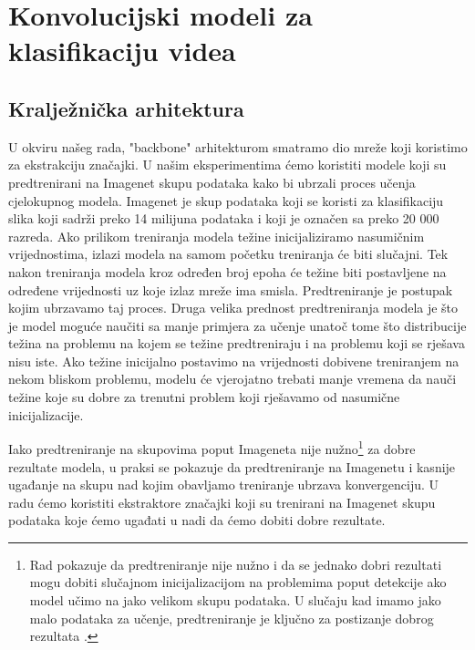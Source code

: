 \documentclass[times, utf8, diplomski,  numeric]{fer}
\begin{document}
\chapter{Konvolucijski modeli za klasifikaciju videa}
\section{Kralježnička arhitektura }
U okviru našeg rada, "backbone" arhitekturom smatramo dio mreže koji koristimo za ekstrakciju značajki. U našim eksperimentima ćemo koristiti modele koji su predtrenirani na Imagenet skupu podataka kako bi ubrzali proces učenja cjelokupnog modela. Imagenet je skup podataka koji se koristi za klasifikaciju slika koji sadrži preko 14 milijuna podataka i koji je označen sa preko 20 000 razreda. Ako prilikom treniranja modela težine inicijaliziramo nasumičnim vrijednostima, izlazi modela na samom početku treniranja će biti slučajni. Tek nakon treniranja modela kroz određen broj epoha će težine biti postavljene na određene vrijednosti uz koje izlaz mreže ima smisla. Predtreniranje je postupak kojim ubrzavamo taj proces. Druga velika prednost predtreniranja modela je što je model moguće naučiti sa manje primjera za učenje \cite{Oquab_2014_CVPR} unatoč tome što distribucije težina na problemu na kojem se težine predtreniraju i na problemu koji se rješava nisu iste. Ako težine inicijalno postavimo na vrijednosti dobivene treniranjem na nekom bliskom problemu, modelu će vjerojatno trebati manje vremena da nauči težine koje su dobre za trenutni problem koji rješavamo od nasumične inicijalizacije.
\par
Iako predtreniranje na skupovima poput Imageneta nije nužno\footnote{Rad \cite{rethinking} pokazuje da predtreniranje nije nužno i da se jednako dobri rezultati mogu dobiti slučajnom inicijalizacijom na problemima poput detekcije ako model učimo na jako velikom skupu podataka. U slučaju kad imamo jako malo podataka za učenje, predtreniranje je ključno za postizanje dobrog rezultata \cite{orsic19cvpr}.} za dobre rezultate modela, u praksi se pokazuje da predtreniranje na Imagenetu i kasnije ugađanje na skupu nad kojim obavljamo treniranje ubrzava konvergenciju. U radu ćemo koristiti ekstraktore značajki koji su trenirani na Imagenet skupu podataka koje ćemo ugađati u nadi da ćemo dobiti dobre rezultate.
\end{document}

